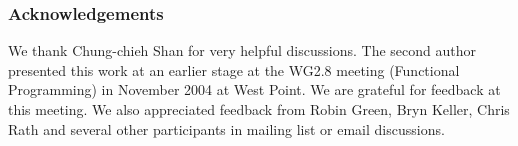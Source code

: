 \documentclass[onecolumn,11pt,preprint]{sigplanconf}
\newcommand{\mysize}{\small}
\begin{document}
\makeatactive


















{\small 

\subsubsection*{Acknowledgements}
 
We thank Chung-chieh Shan for very helpful discussions. The second
author presented this work at an earlier stage at the WG2.8 meeting
(Functional Programming) in November 2004 at West Point. We are
grateful for feedback at this meeting. We also appreciated feedback from
Robin Green, Bryn Keller, Chris Rath and several other participants
in mailing list or email discussions. 

}














\renewcommand{\mysize}{\footnotesize}





\end{document}
